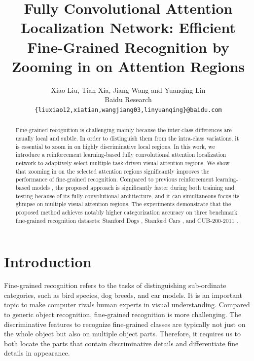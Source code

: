\documentclass[10pt,twocolumn,letterpaper]{article}
\begin{document}
\title{Fully Convolutional Attention Localization Network: Efficient Fine-Grained Recognition by Zooming in on Attention Regions}

\author{Xiao Liu, Tian Xia, Jiang Wang and Yuanqing Lin\\
Baidu Research\\
{\tt\small \{liuxiao12,xiatian,wangjiang03,linyuanqing\}@baidu.com}
}

\maketitle

\begin{abstract}
Fine-grained recognition is challenging mainly because the inter-class differences are usually local and subtle.
In order to distinguish them from the intra-class variations, it is essential to zoom in on highly discriminative local regions.
In this work, we introduce a reinforcement learning-based fully convolutional attention localization network to adaptively select multiple task-driven visual attention regions.
We show that zooming in on the selected attention regions significantly improves the performance of fine-grained recognition.
Compared to previous reinforcement learning-based models \cite{bd1,bd2,bd3}, the proposed approach is significantly faster during both training and testing because of its fully-convolutional architecture, and it can simultaneous focus its glimpse on multiple visual attention regions.
The experiments demonstrate that the proposed method achieves notably higher categorization accuracy on three benchmark fine-grained recognition datasets: Stanford Dogs \cite{bd4}, Stanford Cars \cite{bd5}, and CUB-200-2011 \cite{bd6}.
\end{abstract}

\section{Introduction}
Fine-grained recognition refers to the tasks of distinguishing sub-ordinate categories, such as bird species, dog breeds, and car models. It is an important topic to make computer rivals human experts in visual understanding.
Compared to generic object recognition, fine-grained recognition is more challenging.
The discriminative features to recognize fine-grained classes are typically not just on the whole object but also on multiple object parts.
Therefore, it requires us to both locate the parts that contain discriminative details and differentiate fine details in appearance.
\end{document}
